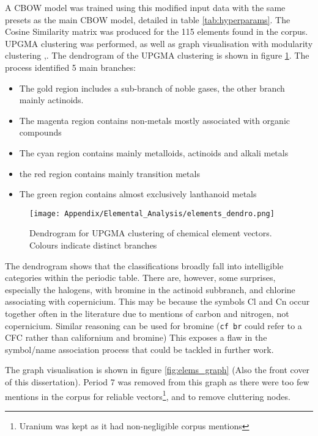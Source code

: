 A CBOW model was trained using this modified input data with the same presets as the main CBOW model, detailed in table \ref{tab:hyperparams}. The Cosine Similarity matrix was produced for the 115 elements found in the corpus. UPGMA clustering was performed\cite{scikitlearn}, as well as graph visualisation with modularity clustering \cite{modularity1},\cite{modularity2}. The dendrogram of the UPGMA clustering is shown in figure \ref{fig:elems_dendro}. The process identified 5 main branches:
\begin{itemize}
\itemsep-0.5em
\item The gold region includes a sub-branch of noble gases, the other branch mainly actinoids.
\item The magenta region contains non-metals mostly associated with organic compounds
\item The cyan region contains mainly metalloids, actinoids and alkali metals
\item the red region contains mainly transition metals
\item The green region contains almost exclusively lanthanoid metals 
\end{itemize}
\begin{center}
\begin{figure}[H]
  \centering
    \texttt{[image: Appendix/Elemental\_Analysis/elements\_dendro.png]}
    \caption[Dendrogram for UPGMA clustering of chemical element vectors]{Dendrogram for UPGMA clustering of chemical element vectors. Colours indicate distinct branches}
    \label{fig:elems_dendro}
\end{figure} 
\end{center}
The dendrogram shows that the classifications broadly fall into intelligible categories within the periodic table. There are, however, some surprises, especially the halogens, with bromine in  the actinoid subbranch, and chlorine associating with copernicium. This may be because the symbols Cl and Cn occur together often in the literature due to mentions of carbon and nitrogen, not copernicium. Similar reasoning can be used for bromine (\texttt{cf br} could refer to a CFC rather than californium and bromine) This exposes a flaw in the symbol/name association process that could be tackled in further work.

The graph visualisation is shown in figure \ref{fig:elems_graph} (Also the front cover of this dissertation). Period 7 was removed from this graph as there were too few mentions in the corpus for reliable vectors\footnote{Uranium was kept as it had non-negligible corpus mentions}, and to remove cluttering nodes.

